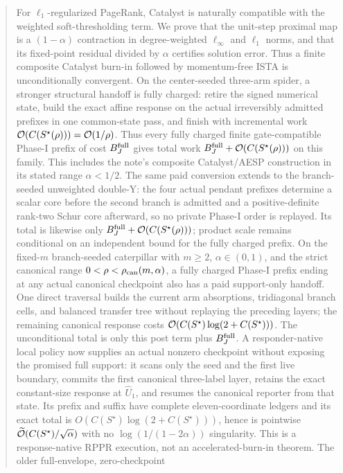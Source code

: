 \documentclass[11pt]{article}
\begin{document}
\begin{abstract}
For $\ell_1$-regularized PageRank, Catalyst is naturally compatible with the
weighted soft-thresholding term. We prove that the unit-step proximal map is a
$(1-\alpha)$ contraction in degree-weighted $\ell_\infty$ and $\ell_1$ norms,
and that its fixed-point residual divided by $\alpha$ certifies solution
error. Thus a finite composite Catalyst burn-in followed by momentum-free
ISTA is unconditionally convergent. On the center-seeded three-arm spider, a
stronger structural handoff is fully charged: retire the signed numerical
state, build the exact affine response on the actual irreversibly admitted
prefixes in one common-state pass, and finish with incremental work
$\bigO(C(S^\star(\rho)))=\bigO(1/\rho)$. Thus every fully charged finite
gate-compatible Phase-I prefix of cost $B_J^{\rm full}$ gives total work
$B_J^{\rm full}+\bigO(C(S^\star(\rho)))$ on this family. This includes the note's
composite Catalyst/AESP construction in its stated range $\alpha<1/2$. The
same paid conversion extends to the branch-seeded unweighted double-Y: the
four actual pendant prefixes determine a scalar core before the second branch
is admitted and a positive-definite rank-two Schur core afterward, so no
private Phase-I order is replayed.  Its total is likewise only
$B_J^{\rm full}+\bigO(C(S^\star(\rho)))$; product scale remains conditional on
an independent bound for the fully charged prefix.  On the fixed-$m$
branch-seeded caterpillar with $m\geq2$, $\alpha\in(0,1)$, and the strict canonical range
$0<\rho<\rho_{\rm can}(m,\alpha)$, a fully charged Phase-I prefix ending at
any actual canonical checkpoint also has a paid support-only handoff.  One
direct traversal builds the current arm absorptions, tridiagonal branch cells,
and balanced transfer tree without replaying the preceding layers; the
remaining canonical response costs
$\bigO(C(S^\star)\log(2+C(S^\star)))$.  The unconditional total is only this
post term plus $B_J^{\rm full}$.  A responder-native local policy now supplies
an actual nonzero checkpoint without exposing the promised full support: it
scans only the seed and the first live boundary, commits the first canonical
three-label layer, retains the exact constant-size response at
$\widehat U_1$, and resumes the canonical reporter from that state.  Its
prefix and suffix have complete eleven-coordinate ledgers and its exact total
is $O(C(S^\star)\log(2+C(S^\star)))$, hence is pointwise
$\softO(C(S^\star)/\sqrt\alpha)$ with no
$\log(1/(1-2\alpha))$ singularity.  This is a response-native RPPR execution,
not an accelerated-burn-in theorem.  The older full-envelope, zero-checkpoint

\end{abstract}
\end{document}
